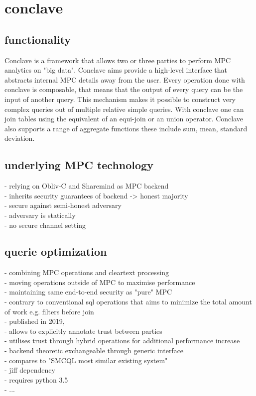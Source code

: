 \section{conclave}


\subsection{functionality}
Conclave is a framework that allows two or three parties to perform MPC analytics on "big data". Conclave aims provide a high-level interface that abstracts internal MPC details away from the user. Every operation done with conclave is composable, that means that the output of every query can be the input of another query. This mechanism makes it possible to construct very complex queries out of multiple relative simple queries.  With conclave one can join tables using the equivalent of an equi-join or an union operator. Conclave also supports a range of aggregate functions these include sum, mean, standard deviation. 

\subsection{underlying MPC technology}
- relying on Obliv-C and Sharemind as MPC backend\\
- inherits security guarantees of backend -> honest majority \\
- secure against semi-honest adversary \\
- adversary is statically\\
- no secure channel setting\\


\subsection{querie optimization}
- combining MPC operations and cleartext processing\\ 
- moving operations outside of MPC to maximise performance\\
- maintaining same end-to-end security as "pure" MPC     \\
- contrary to conventional sql operations that aims to minimize the total amount of work e.g. filters before join \\


- published in 2019,\\
- allows to explicitly annotate trust between parties\\
- utilises trust through hybrid operations for additional performance increase \\
- backend theoretic exchangeable through generic interface\\
- compares to "SMCQL most similar existing system"\\
- jiff dependency \\
- requires python 3.5 \\
- ...
